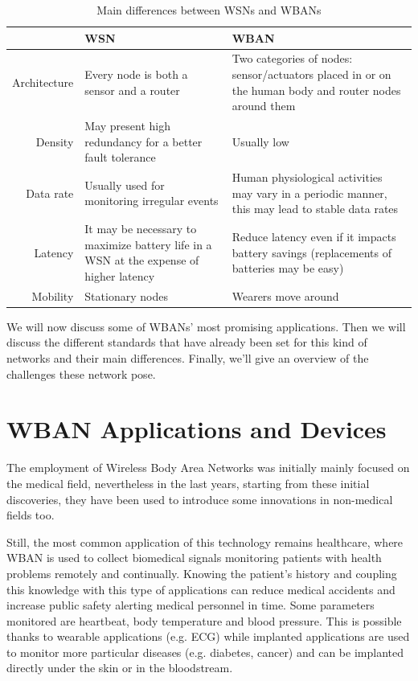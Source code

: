 \documentclass[conference]{IEEEtran}
\begin{document}
\begin{table}[htbp]
	\caption{Main differences between WSNs and WBANs}
	\begin{tabularx}{0.5\textwidth}{r|X|X|}
	 & \textbf{WSN} & \textbf{WBAN} \\
	\hline
	Architecture & Every node is both a sensor and a router & Two categories of nodes: sensor/actuators placed in or on the human body and router nodes around them \\
	\hline
	Density & May present high redundancy for a better fault tolerance & Usually low \\
	\hline
	Data rate & Usually used for monitoring irregular events & Human physiological activities may vary in a periodic manner, this may lead to stable data rates \\
	\hline
	Latency	& It may be necessary to maximize battery life in a WSN at the expense of higher latency & Reduce latency even if it impacts battery savings (replacements of batteries may be easy) \\
	\hline
	Mobility & Stationary nodes & Wearers move around \\
	\hline
	\end{tabularx}
	\label{tab1}
	\end{table}

We will now discuss some of WBANs' most promising applications. Then we will discuss the different standards that have already been set for this kind of networks and their main differences. Finally, we’ll give an overview of the challenges these network pose.


\section{WBAN Applications and Devices}
The employment of Wireless Body Area Networks was initially mainly focused on the medical field, nevertheless in the last years, starting from these initial discoveries, they have been used to introduce some innovations in non-medical fields too.

Still, the most common application of this technology remains healthcare, where WBAN is used to collect biomedical signals monitoring patients with health problems remotely and continually. 
Knowing the patient's history and coupling this knowledge with this type of applications can reduce medical accidents and increase public safety alerting medical personnel in time. Some parameters monitored are heartbeat, body temperature and blood pressure. This is possible thanks to wearable applications (e.g. ECG) while implanted applications are used to monitor more particular diseases (e.g. diabetes, cancer) and can be implanted directly under the skin or in the bloodstream.
\end{document}
